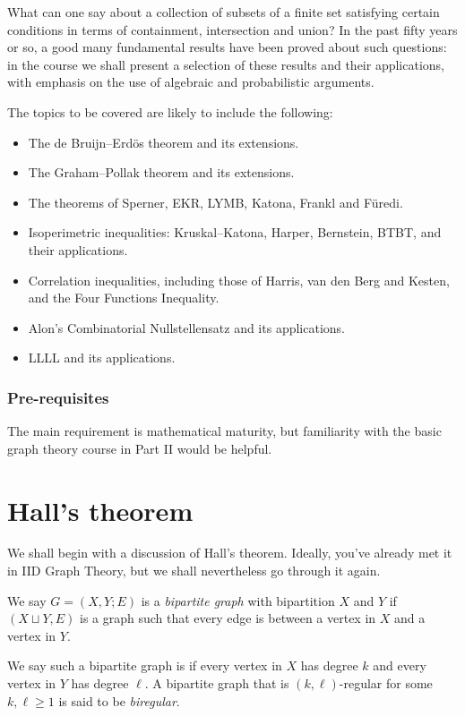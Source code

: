 \documentclass[a4paper]{article}
\begin{document}
\maketitle
{\small
\setlength{\parindent}{0em}
\setlength{\parskip}{1em}

What can one say about a collection of subsets of a finite set satisfying certain conditions in terms of containment, intersection and union? In the past fifty years or so, a good many fundamental results have been proved about such questions: in the course we shall present a selection of these results and their applications, with emphasis on the use of algebraic and probabilistic arguments.

The topics to be covered are likely to include the following:
\begin{itemize}
 \item The de Bruijn--Erd\"os theorem and its extensions.
 \item The Graham--Pollak theorem and its extensions.
 \item The theorems of Sperner, EKR, LYMB, Katona, Frankl and F\"uredi. %
 \item Isoperimetric inequalities: Kruskal--Katona, Harper, Bernstein, BTBT, and their applications.
 \item Correlation inequalities, including those of Harris, van den Berg and Kesten, and the Four Functions Inequality.
 \item Alon's Combinatorial Nullstellensatz and its applications.
 \item LLLL and its applications.
\end{itemize}

\subsubsection*{Pre-requisites}
The main requirement is mathematical maturity, but familiarity with the basic graph theory course in Part II would be helpful.
}
\tableofcontents

\section{Hall's theorem}
We shall begin with a discussion of Hall's theorem. Ideally, you've already met it in IID Graph Theory, but we shall nevertheless go through it again.

\begin{defi}
  We say $G = (X, Y; E)$ is a \emph{bipartite graph} with bipartition $X$ and $Y$ if $(X \sqcup Y, E)$ is a graph such that every edge is between a vertex in $X$ and a vertex in $Y$.

  We say such a bipartite graph is  if every vertex in $X$ has degree $k$ and every vertex in $Y$ has degree $\ell$. A bipartite graph that is $(k, \ell)$-regular for some $k, \ell \geq 1$ is said to be \emph{biregular}.
\end{defi}
\end{document}
